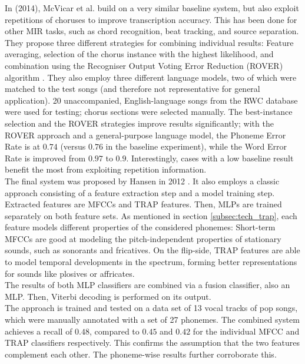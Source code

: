 In \cite{McVicar2014} (2014), McVicar et al. build on a very similar baseline system, but also exploit repetitions of choruses to improve transcription accuracy. This has been done for other MIR tasks, such as chord recognition, beat tracking, and source separation. They propose three different strategies for combining individual results: Feature averaging, selection of the chorus instance with the highest likelihood, and combination using the Recogniser Output Voting Error Reduction (ROVER) algorithm \cite{rover}. They also employ three different language models, two of which were matched to the test songs (and therefore not representative for general application). 20 unaccompanied, English-language songs from the RWC database \cite{rwc} were used for testing; chorus sections were selected manually. The best-instance selection and the ROVER strategies improve results significantly; with the ROVER approach and a general-purpose language model, the Phoneme Error Rate is at $0.74$ (versus $0.76$ in the baseline experiment), while the Word Error Rate is improved from $0.97$ to $0.9$. Interestingly, cases with a low baseline result benefit the most from exploiting repetition information.\\

The final system was proposed by Hansen in 2012 \cite{jens}. It also employs a classic approach consisting of a feature extraction step and a model training step. Extracted features are MFCCs and TRAP features. Then, MLPs are trained separately on both feature sets. As mentioned in section \ref{subsec:tech_trap}, each feature models different properties of the considered phonemes: Short-term MFCCs are good at modeling the pitch-independent properties of stationary sounds, such as sonorants and fricatives. On the flip-side, TRAP features are able to model temporal developments in the spectrum, forming better representations for sounds like plosives or affricates.\\
The results of both MLP classifiers are combined via a fusion classifier, also an MLP. Then, Viterbi decoding is performed on its output.\\
The approach is trained and tested on a data set of 13 vocal tracks of pop songs, which were manually annotated with a set of 27 phonemes. The combined system achieves a recall of $0.48$, compared to $0.45$ and $0.42$ for the individual MFCC and TRAP classifiers respectively. This confirms the assumption that the two features complement each other. The phoneme-wise results further corroborate this.\\


